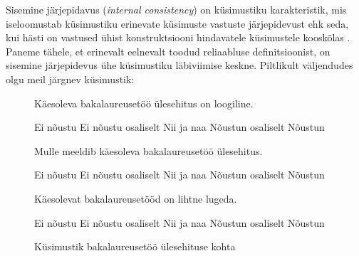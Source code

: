 \documentclass[a4paper,12pt,oneside]{article}
\numberwithin{equation}{section}
\theoremstyle{definition}
\begin{document}
Sisemine järjepidavus (\textit{internal consistency}) on küsimustiku karakteristik, mis iseloomustab küsimustiku erinevate k\"usimuste vastuste järjepidevust ehk seda, kui hästi on   vastused \"uhist  konstruktsiooni hindavatele k\"usimustele kooskõlas \cite[177] {Henson2001}. Paneme tähele, et erinevalt eelnevalt toodud reliaabluse definitsioonist, on sisemine järjepidevus ühe küsimustiku läbiviimise keskne. Piltlikult väljendudes olgu meil järgnev k\"usimustik: 


\begin{figure}[H]

\colorbox{background_example}{\parbox{\textwidth}{

\vspace{1mm}

Käesoleva bakalaureusetöö \"ulesehitus on loogiline.

\vspace{5pt}


\begin{Form}
\def\DefaultWidthofChoiceMenu{12pt}%
\small{
\CheckBox[bordercolor = gray,name=optionE1]{\mbox{}} Ei nõustu 
\CheckBox[bordercolor = gray,name=optionD1]{\mbox{}} Ei nõustu osaliselt
\CheckBox[bordercolor = gray,name=optionC1]{\mbox{}} Nii ja naa
\CheckBox[bordercolor = gray,name=optionC1]{\mbox{}}  Nõustun osaliselt
\CheckBox[bordercolor = gray,name=optionC1]{\mbox{}} Nõustun
}
\end{Form}

\vspace{10pt}

Mulle meeldib käesoleva bakalaureusetöö ülesehitus.

\vspace{5pt}

\begin{Form}
\def\DefaultWidthofChoiceMenu{12pt}%
\small{
\CheckBox[bordercolor = gray,name=optionE1]{\mbox{}} Ei nõustu 
\CheckBox[bordercolor = gray,name=optionD1]{\mbox{}} Ei nõustu osaliselt
\CheckBox[bordercolor = gray,name=optionC1]{\mbox{}} Nii ja naa
\CheckBox[bordercolor = gray,name=optionC1]{\mbox{}}  Nõustun osaliselt
\CheckBox[bordercolor = gray,name=optionC1]{\mbox{}} Nõustun
}
\end{Form}

\vspace{10pt}

Käesolevat bakalaureusetööd on lihtne lugeda.

\vspace{5pt}

\begin{Form}
\def\DefaultWidthofChoiceMenu{12pt}%
\small{
\CheckBox[bordercolor = gray,name=optionE1]{\mbox{}} Ei nõustu 
\CheckBox[bordercolor = gray,name=optionD1]{\mbox{}} Ei nõustu osaliselt
\CheckBox[bordercolor = gray,name=optionC1]{\mbox{}} Nii ja naa
\CheckBox[bordercolor = gray,name=optionC1]{\mbox{}}  Nõustun osaliselt
\CheckBox[bordercolor = gray,name=optionC1]{\mbox{}} Nõustun
}
\end{Form}

\vspace{2pt}

}}
\caption{K\"usimustik bakalaureusetöö \"ulesehituse kohta }
\label{quiz_consistency}
\end{figure}
\end{document}
